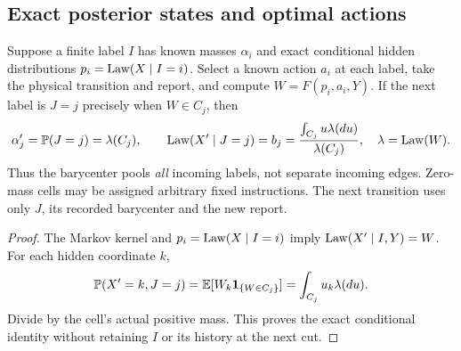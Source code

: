 \subsection{Exact posterior states and optimal actions}
\begin{lemma}\label{lem:aggregation}
Suppose a finite label $I$ has known masses $\alpha_i$ and exact conditional hidden distributions $p_i=\operatorname{Law}(X\mid I=i)$. Select a known action $a_i$ at each label, take the physical transition and report, and compute $W=F(p_i,a_i,Y)$. If the next label is $J=j$ precisely when $W\in C_j$, then
\begin{equation}\label{eq:barycenter}
 \alpha'_j=\mathbb P(J=j)=\lambda(C_j),\qquad
 \operatorname{Law}(X'\mid J=j)=b_j=\frac{\int_{C_j}u\lambda(du)}{\lambda(C_j)},
 \quad\lambda=\operatorname{Law}(W).
\end{equation}
Thus the barycenter pools \emph{all} incoming labels, not separate incoming edges. Zero-mass cells may be assigned arbitrary fixed instructions. The next transition uses only $J$, its recorded barycenter and the new report.
\end{lemma}
\begin{proof}
The Markov kernel and $p_i=\operatorname{Law}(X\mid I=i)$ imply $\operatorname{Law}(X'\mid I,Y)=W$. For each hidden coordinate $k$,
\[
 \mathbb P(X'=k,J=j)=\mathbb E[W_k\mathbf1_{\{W\in C_j\}}]
                =\int_{C_j}u_k\lambda(du).
\]
Divide by the cell's actual positive mass. This proves the exact conditional identity without retaining $I$ or its history at the next cut.
\end{proof}

